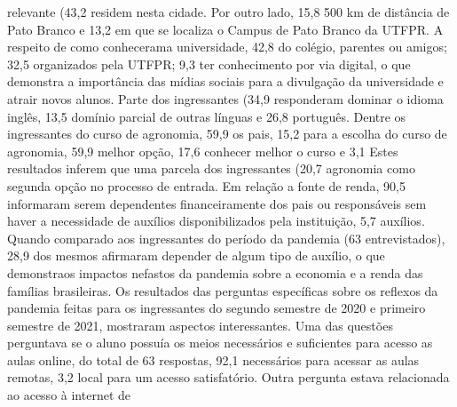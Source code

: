 relevante (43,2%
residem nesta cidade. Por outro lado, 15,8%
500 km de distância de Pato Branco e 13,2%
em que se localiza o Campus de Pato Branco da UTFPR. A respeito de como conhecerama 
universidade, 42,8%
do colégio, parentes ou amigos; 32,5%
organizados pela UTFPR; 9,3%
ter conhecimento por via digital, o que demonstra a importância das mídias sociais para a
divulgação da universidade e atrair novos alunos.
Parte dos ingressantes (34,9%
responderam dominar o idioma inglês, 13,5%
domínio parcial de outras línguas e 26,8%
português. Dentre os ingressantes do curso de agronomia, 59,9%
os pais, 15,2%
para a escolha do curso de agronomia, 59,9%
melhor opção, 17,6%
conhecer melhor o curso e 3,1%
Estes resultados inferem que uma parcela dos ingressantes (20,7%
agronomia como segunda opção no processo de entrada. Em relação a fonte de renda, 90,5%
informaram serem dependentes financeiramente dos pais ou responsáveis sem haver a necessidade
de auxílios disponibilizados pela instituição, 5,7%
auxílios. Quando comparado aos ingressantes do período da pandemia (63 entrevistados), 28,9%
dos mesmos afirmaram depender de algum tipo de auxílio, o que demonstraos impactos nefastos da
pandemia sobre a economia e a renda das famílias brasileiras.
Os resultados das perguntas específicas sobre os reflexos da pandemia feitas para os
ingressantes do segundo semestre de 2020 e primeiro semestre de 2021, mostraram aspectos
interessantes. Uma das questões perguntava se o aluno possuía os meios necessários e suficientes
para acesso as aulas online, do total de 63 respostas, 92,1%
necessários para acessar as aulas remotas, 3,2%
local para um acesso satisfatório. Outra pergunta estava relacionada ao acesso à internet de
